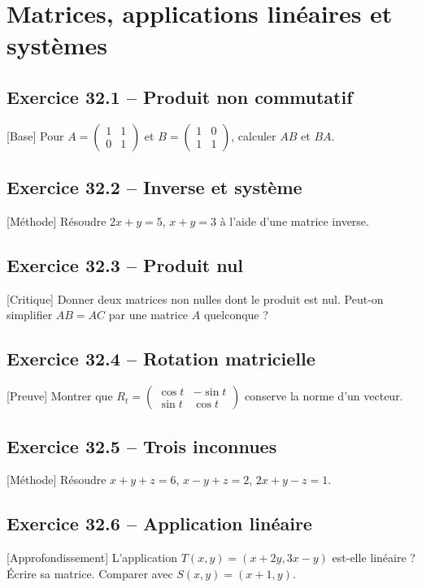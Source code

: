 \chapter{Matrices, applications linéaires et systèmes}
\section*{Exercice 32.1 -- Produit non commutatif}
[Base] Pour $A=\begin{pmatrix}1&1\\0&1\end{pmatrix}$ et $B=\begin{pmatrix}1&0\\1&1\end{pmatrix}$, calculer $AB$ et $BA$.

\section*{Exercice 32.2 -- Inverse et système}
[Méthode] Résoudre $2x+y=5$, $x+y=3$ à l'aide d'une matrice inverse.

\section*{Exercice 32.3 -- Produit nul}
[Critique] Donner deux matrices non nulles dont le produit est nul. Peut-on simplifier $AB=AC$ par une matrice $A$ quelconque ?

\section*{Exercice 32.4 -- Rotation matricielle}
[Preuve] Montrer que $R_t=\begin{pmatrix}\cos t&-\sin t\\\sin t&\cos t\end{pmatrix}$ conserve la norme d'un vecteur.

\section*{Exercice 32.5 -- Trois inconnues}
[Méthode] Résoudre $x+y+z=6$, $x-y+z=2$, $2x+y-z=1$.

\section*{Exercice 32.6 -- Application linéaire}
[Approfondissement] L'application $T(x,y)=(x+2y,3x-y)$ est-elle linéaire ? Écrire sa matrice. Comparer avec $S(x,y)=(x+1,y)$.
